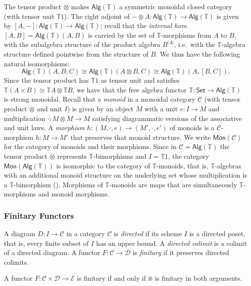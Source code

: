 \documentclass[a4paper, UKenglish, numberwithinsect, thm-restate, cleveref, final]{lipics-v2021}
\theoremstyle{plain}
\theoremstyle{definition}
\newcommand{\C}{\ensuremath{\mathcal{C}}}
\newcommand{\T}{\ensuremath{\mathbb{T}}\xspace}
\newcommand{\D}{\ensuremath{\mathcal{D}}}
\newcommand{\Alg}{\ensuremath{\mathsf{Alg}}}
\newcommand{\Set}{\ensuremath{\mathsf{Set}}\xspace}
\newcommand{\mult}{\mathbin{\boldsymbol{\cdot}}}
\newcommand{\cat}[1]{\ensuremath{\mathcal{#1}}\xspace}
\newcommand{\Mon}{\mathsf{Mon}}
\numberwithin{equation}{section}
\begin{document}
The tensor product $\otimes$ makes $\Alg(\T)$ a symmetric monoidal closed category (with tensor unit $\T 1$). The right adjoint of $- \otimes A\colon \Alg(\T)\to \Alg(\T)$ is given by $[A,-]\colon \Alg(\T)\to \Alg(\T)$;
recall that the \emph{internal hom} $[A,B]=\Alg(\T)(A,B)$ is carried by the set of \(\T\)-morphisms from \(A\) to \(B\), with the subalgebra structure of the product algebra $B^{|A|}$, i.e.~with the $\T$-algebra structure defined pointwise from the structure of $B$. We thus have the following natural isomorphisms:
\[ \Alg(\T)(A,B;C) \cong \Alg(\T)(A\otimes B,C)\cong \Alg(\T)(A,[B,C]). \]
Since the tensor product has \(\T 1\) as tensor unit and satisfies \(\T(A \times B) \cong \T A \otimes \T B\), we have that the free algebra functor \(\T \colon \Set \rightarrow \Alg(\T)\) is strong monoidal.
Recall that a \emph{monoid} in a monoidal category $\C$ (with tensor product $\otimes$ and unit $I$) is given by an object $M$ with a unit $e\colon I\to M$ and multiplication $\mult\colon M\otimes M\to M$ satisfying diagrammatic versions of the associative and unit laws. A \emph{morphism} $h\colon (M,\mult,e)\to (M',\mult,e')$ of monoids is a $\C$-morphism $h\colon M\to M'$ that preserves that monoid structure. We write $\Mon(\C)$ for the category of monoids and their morphisms. Since in $\C=\Alg(\T)$ the tensor product $\otimes$ represents $\T$-bimorphisms and $I=\T 1$, the category $\Mon(\Alg(\T))$ is isomorphic to the category of $\T$-monoids, that is, $\T$-algebras with an additional monoid structure on the underlying set whose multiplication is a $\T$-bimorphism (). Morphisms of $\T$-monoids are maps that are simultaneously $\T$-morphisms and monoid morphisms.

\subsubsection*{Finitary Functors}
A diagram $D\colon I\to \C$ in a category $\C$ is \emph{directed} if its scheme $I$ is a directed poset, that is, every finite subset of $I$ has an upper bound. A \emph{directed colimit} is a colimit of a directed diagram. A functor $F\colon \C\to \D$ is \emph{finitary} if it preserves directed colimits.

  \begin{proposition}\label{prop:pointwise-finitary-implies-finitary}
    A functor \(F \colon \C \times \cat D \rightarrow \cat E\) is finitary if and only if it is finitary in both arguments.
  \end{proposition}
\end{document}
